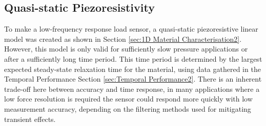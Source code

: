 
\subsection{Quasi-static Piezoresistivity}\label{Quasi-static Piezoresistivity3}
To make a low-frequency response load sensor, a quasi-static piezoresistive linear model was created as shown in Section \ref{sec:1D Material Characterisation2}. However, this model is only valid for sufficiently slow pressure applications or after a sufficiently long time period. This time period is determined by the largest expected steady-state relaxation time for the material, using data gathered in the Temporal Performance Section \ref{sec:Temporal Performance2}. There is an inherent trade-off here between accuracy and time response, in many applications where a low force resolution is required the sensor could respond more quickly with low measurement accuracy, depending on the filtering methods used for mitigating transient effects.

